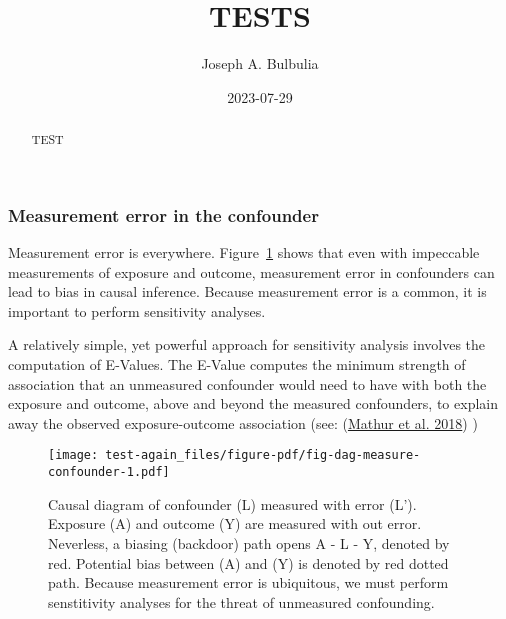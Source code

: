 \documentclass[
  singlecolumn]{article}
\title{TESTS}
\author{Joseph A. Bulbulia}
\affil{%
                  Victoria University of Wellington, New Zealand, School
                  of Psychology, Centre for Applied Cross-Cultural
                  Research
              }
\date{2023-07-29}
\begin{document}
\maketitle
\begin{abstract}
TEST
\end{abstract}
\ifdefined\Shaded\renewenvironment{Shaded}{\begin{tcolorbox}[interior hidden, enhanced, boxrule=0pt, borderline west={3pt}{0pt}{shadecolor}, breakable, sharp corners, frame hidden]}{\end{tcolorbox}}\fi

\hypertarget{measurement-error-in-the-confounder}{%
\subsubsection{Measurement error in the
confounder}\label{measurement-error-in-the-confounder}}

Measurement error is everywhere. Figure~\ref{fig-dag-measure-confounder}
shows that even with impeccable measurements of exposure and outcome,
measurement error in confounders can lead to bias in causal inference.
Because measurement error is a common, it is important to perform
sensitivity analyses.

A relatively simple, yet powerful approach for sensitivity analysis
involves the computation of E-Values. The E-Value computes the minimum
strength of association that an unmeasured confounder would need to have
with both the exposure and outcome, above and beyond the measured
confounders, to explain away the observed exposure-outcome association
(see: (\protect\hyperlink{ref-mathur2018}{Mathur et al. 2018}) )

\begin{figure}

{\centering \texttt{[image: test-again\_files/figure-pdf/fig-dag-measure-confounder-1.pdf]}

}

\caption{\label{fig-dag-measure-confounder}Causal diagram of confounder
(L) measured with error (L'). Exposure (A) and outcome (Y) are measured
with out error. Neverless, a biasing (backdoor) path opens A - L - Y,
denoted by red. Potential bias between (A) and (Y) is denoted by red
dotted path. Because measurement error is ubiquitous, we must perform
senstitivity analyses for the threat of unmeasured confounding.}

\end{figure}
\end{document}
